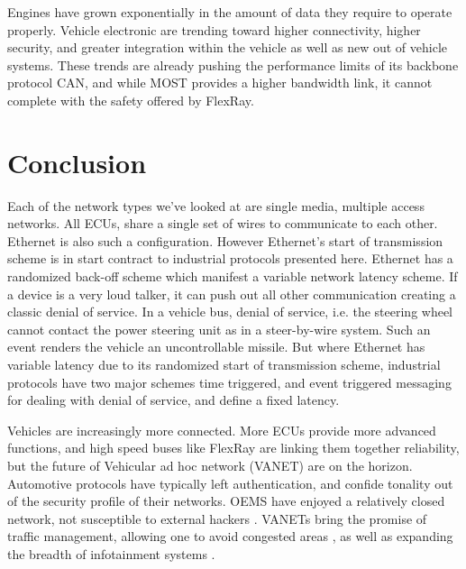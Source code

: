 \documentclass[conference,12pt]{IEEEtran}
\begin{document}
Engines have grown exponentially in the amount of data they require to operate
properly. 
Vehicle electronic are trending toward higher connectivity, higher security, and
greater integration within the vehicle as well as new out of vehicle systems.
These trends are already pushing the performance limits of its backbone protocol
CAN, and while MOST provides a higher bandwidth link, it cannot complete with
the safety offered by FlexRay.

\section{Conclusion}
Each of the network types we've looked at are single media, multiple access
networks.  All ECUs, share a single set of wires to communicate to each other.
Ethernet is also such a configuration. However Ethernet's start of transmission
scheme is in start contract to industrial protocols presented here. Ethernet has
a randomized back-off scheme which manifest a variable network latency scheme.
If a device is a very loud talker, it can push out all other communication
creating a classic denial of service. In a vehicle bus, denial of service, i.e.
the steering wheel cannot contact the power steering unit as in a steer-by-wire
system. Such an event renders the vehicle an uncontrollable missile. But where Ethernet has variable latency
due to its randomized start of transmission scheme, industrial protocols have
two major schemes time triggered, and event triggered messaging for dealing with denial of service, and define a fixed
latency. 

Vehicles are increasingly more connected. More ECUs provide more advanced
functions, and high speed buses like FlexRay are linking them together
reliability, but the future of Vehicular ad hoc network (VANET) are on the
horizon. Automotive protocols have typically left authentication, and
confide tonality out of the security profile of their networks. OEMS have
enjoyed a relatively closed network, not susceptible to external hackers
\autocite{zhou_research_2012}. VANETs bring the promise of traffic management,
allowing one to avoid congested areas \autocite{nafi_vanet_2012}, as well as
expanding the breadth of infotainment systems \autocite{noori_novel_2013}.
\end{document}

